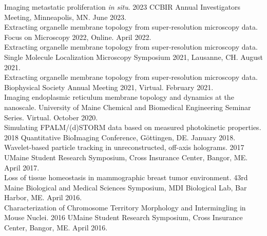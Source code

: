 {
    Imaging metastatic proliferation \textit{in situ}. 2023 CCBIR Annual Investigators Meeting, Minneapolis, MN. June 2023. \\

    Extracting organelle membrane topology from super-resolution microscopy data. Focus on Microscopy 2022, Online. April 2022. \\

    Extracting organelle membrane topology from super-resolution microscopy data. Single Molecule Localization Microscopy Symposium 2021, Lausanne, CH. August 2021. \\

    Extracting organelle membrane topology from super-resolution microscopy data. Biophysical Society Annual Meeting 2021, Virtual. February 2021. \\

    Imaging endoplasmic reticulum membrane topology and dynamics at the nanoscale. University of Maine Chemical and Biomedical Engineering Seminar Series. Virtual. October 2020. \\
    
    Simulating FPALM/(d)STORM data based on measured photokinetic properties. 2018 Quantitative BioImaging Conference, Göttingen, DE. January 2018. \\

    Wavelet-based particle tracking in unreconstructed, off-axis holograms. 2017 UMaine Student Research Symposium, Cross Insurance Center, Bangor, ME. April 2017. \\

    Loss of tissue homeostasis in mammographic breast tumor environment. 43rd Maine Biological and Medical Sciences Symposium, MDI Biological Lab, Bar Harbor, ME. April 2016. \\

    Characterization of Chromosome Territory Morphology and Intermingling in Mouse Nuclei. 2016 UMaine Student Research Symposium, Cross Insurance Center, Bangor, ME. April 2016. \\
}

\vspace{11pt}
